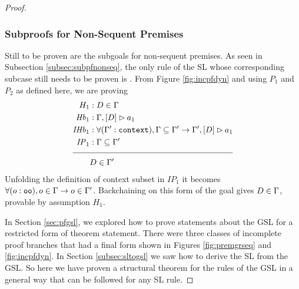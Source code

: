 \begin{proof}
\subsubsection{Subproofs for Non-Sequent Premises}

Still to be proven are the subgoals for non-sequent premises. As seen in Subsection \ref{subsec:subpfnonseq}, the only rule of the SL whose corresponding subcase still needs to be proven is \rlnmsinit{}. From Figure \ref{fig:incpfdyn} and using $P_1$ and $P_2$ as defined here, we are proving
\begin{align*}
H_1 &: D \in \dyncon{} \\
\mathit{Hb}_1 &: \bchsl{D}{a_1} \\
\mathit{IHb}_1 &: \forall (\inddyncon{} : \sltm{context}), \dyncon{} \subseteq \inddyncon{} \rightarrow \bchsl[\inddyncon{}]{D}{a_1} \\
\mathit{IP}_1 &: \dyncon{} \subseteq \inddyncon{} \\[\pfshift{}]
\cline{1-2}
& D \in \inddyncon{}
\end{align*}
Unfolding the definition of context subset in $\mathit{IP}_1$ it becomes $\forall (o : \texttt{oo}), o \in \Gamma{} \rightarrow o \in \Gamma'{}$. 
Backchaining on this form of the goal
gives $D \in \Gamma{}$, provable by assumption $H_1$.


In Section \ref{sec:pfgsl}, we explored how to prove statements about the GSL for a restricted form of theorem statement. There were three classes of incomplete proof branches that had a final form shown in Figures \ref{fig:premgrseq} and \ref{fig:incpfdyn}. In Section \ref{subsec:sltogsl} we saw how to derive the SL from the GSL. So here we have proven a structural theorem for the rules of the GSL in a general way that can be followed for any SL rule.
\end{proof}